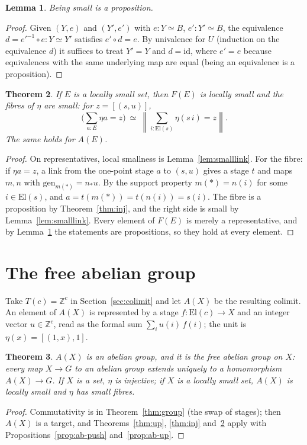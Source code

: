 \documentclass[11pt]{amsart}
\newtheorem{theorem}{Theorem}[section]
\newtheorem{lemma}[theorem]{Lemma}
\theoremstyle{definition}
\theoremstyle{remark}
\newcommand{\mere}[1]{\left\lVert #1\right\rVert}
\newcommand{\El}{\mathrm{El}}
\newcommand{\Z}{\mathbb{Z}}
\begin{document}
\begin{lemma}\label{lem:smallprop}
Being small is a proposition.
\end{lemma}
\begin{proof}
Given $(Y,e)$ and $(Y',e')$ with $e:Y\simeq B$, $e':Y'\simeq B$, the
equivalence $d=e'^{-1}\circ e:Y\simeq Y'$ satisfies $e'\circ d=e$. By
univalence for $U$ (induction on the equivalence $d$) it suffices to
treat $Y'=Y$ and $d=\mathrm{id}$, where $e'=e$ because equivalences with
the same underlying map are equal (being an equivalence is a
proposition).
\end{proof}

\begin{theorem}\label{thm:size}
If $E$ is a locally small set, then $F(E)$ is locally small and the
fibres of $\eta$ are small: for $z=[(s,u)]$,
\[
\big(\textstyle\sum_{a:E}\eta a=z\big)\ \simeq\ \mere{\textstyle\sum_{i:\El(s)}\eta(s\,i)=z}.
\]
The same holds for $A(E)$.
\end{theorem}
\begin{proof}
On representatives, local smallness is Lemma~\ref{lem:smalllink}. For
the fibre: if $\eta a=z$, a link from the one-point stage $a$ to $(s,u)$
gives a stage $t$ and maps $m,n$ with $\text{gen}_{m(*)}=n_*u$. By the
support property $m(*)=n(i)$ for some $i\in\El(s)$, and
$a=t(m(*))=t(n(i))=s(i)$. The fibre is a proposition by
Theorem~\ref{thm:inj}, and the right side is small by
Lemma~\ref{lem:smalllink}. Every element of $F(E)$ is merely a
representative, and by Lemma~\ref{lem:smallprop} the statements are
propositions, so they hold at every element.
\end{proof}


\section{The free abelian group}\label{sec:abfree}

Take $T(c)=\Z^c$ in Section~\ref{sec:colimit} and let $A(X)$ be the
resulting colimit. An element of $A(X)$ is represented by a stage
$f:\El(c)\to X$ and an integer vector $u\in\Z^c$, read as the formal sum
$\sum_i u(i)\,f(i)$; the unit is $\eta(x)=[(1,x),1]$.

\begin{theorem}
$A(X)$ is an abelian group, and it is the free abelian group on $X$: every
map $X\to G$ to an abelian group extends uniquely to a homomorphism
$A(X)\to G$. If $X$ is a set, $\eta$ is injective; if $X$ is a locally
small set, $A(X)$ is locally small and $\eta$ has small fibres.
\end{theorem}
\begin{proof}
Commutativity is in Theorem~\ref{thm:group} (the swap of stages); then
$A(X)$ is a target, and Theorems~\ref{thm:up}, \ref{thm:inj}
and~\ref{thm:size} apply with Propositions~\ref{prop:ab-push}
and~\ref{prop:ab-up}.
\end{proof}
\end{document}
